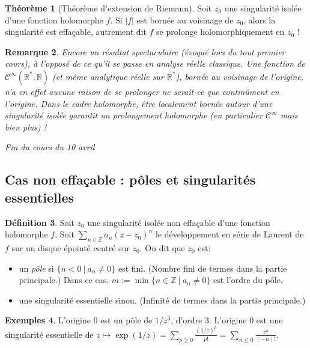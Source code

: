 \documentclass[11pt,a4paper]{book}
\newcommand{\Z}{\mathbb{Z}}
\newcommand{\R}{\mathbb{R}}
\theoremstyle{definition}
\newtheorem{theoreme}{Th\'eor\`eme}[section]
\newtheorem{definition}[theoreme]{D\'efinition}
\newtheorem{exemples}[theoreme]{Exemples}
\theoremstyle{plain}
\newtheorem{remarque}[theoreme]{Remarque}
\begin{document}
\begin{theoreme}[Théorème d'extension de Riemann]
Soit $z_0$ une singularité isolée d'une fonction holomorphe $f$.
Si $|f|$ est bornée au voisinage de $z_0$, alors la singularité est effaçable, autrement dit $f$ se prolonge holomorphiquement en $z_0$ !
\end{theoreme}

\begin{remarque}
Encore un résultat spectaculaire (évoqué lors du tout premier cours), à l'opposé de ce qu'il se passe  en analyse réelle classique.
Une fonction de $\mathcal C^\infty(\R^*,\R)$ (et même analytique réelle sur $\R^*$), bornée au voisinage de l'origine, n'a en effet aucune raison de se prolonger ne serait-ce que continûment en l'origine. 
Dans le cadre holomorphe, être localement bornée autour d'une singularité isolée garantit un prolongement holomorphe (en particulier $\mathcal C^\infty$ mais bien plus) !
\end{remarque}


\begin{center}
\hrulefill \emph{Fin du cours du 10 avril} \hrulefill
\end{center}

\subsection{Cas non effaçable : pôles et singularités essentielles}

\begin{definition}
Soit $z_0$ une singularité isolée non effaçable d'une fonction holomorphe $f$.
Soit $\sum_{n\in \Z}a_n(z-z_0)^n$ le développement en série de Laurent de $f$ sur un disque épointé centré sur $z_0$.
On dit que $z_0$ est:
\begin{itemize}
\item un \emph{pôle} si $\{n<0\:|\: a_n\neq 0\}$ est fini. (Nombre fini de termes dans la partie principale.) Dans ce cas, $m:=\min\{n\in \Z\:|\: a_n\neq 0\}$ est l'ordre du pôle.
\item une singularité essentielle sinon. (Infinité de termes dans la partie principale.)
\end{itemize}
\end{definition}

\begin{exemples}
L'origine $0$ est un pôle de $1/z^3$, d'ordre $3$. 
L'origine $0$ est une singularité essentielle de $z\mapsto \exp(1/z)=\sum_{p\geq 0}\frac{(1/z)^p}{p!} = \sum_{n\leq 0} \frac{z^n}{(-n)!}$.
\end{exemples}
\end{document}
